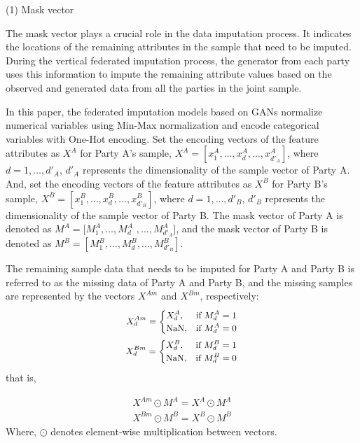 \documentclass[final,1p,times]{elsarticle}
\begin{document}
(1) Mask vector 

The mask vector plays a crucial role in the data imputation process. It indicates the locations of the remaining attributes in the sample that need to be imputed. During the vertical federated imputation process, the generator from each party uses this information to impute the remaining attribute values based on the observed and generated data from all the parties in the joint sample. 

In this paper, the federated imputation models based on GANs normalize numerical variables using Min-Max normalization and encode categorical variables with One-Hot encoding. Set the encoding vectors of the feature attributes as \( X^A \) for Party A's sample, \(X^A = [x_1^A, \dots, x_d^A, \dots, x_{d'_A}^A]\), where \( d = 1, \dots, d'_A \),  \( d'_A \) represents the dimensionality of the sample vector of Party A. And, set the encoding vectors of the feature attributes as \( X^B \) for Party B's sample, \(X^B = [x_1^B, \dots, x_d^B, \dots, x_{d'_B}^B]\), where \( d = 1, \dots, d'_B \), \( d'_B \) represents the dimensionality of the sample vector of Party B. The mask vector of Party A is denoted as \(M^A = [M_1^A, \dots, M_d^A\) \(,\dots,M_{d'_A}^A]\), and the mask vector of Party B is denoted as \(M^B = [M_1^B, \dots, M_d^B, \dots, M_{d'_B}^B]\). 

The remaining sample data that needs to be imputed for Party A and Party B is referred to as the missing data of Party A and Party B, and the missing samples are represented by the vectors \( X^{Am} \) and \( X^{Bm} \), respectively:
\begin{equation}
	\small
	\begin{split}
		X_{d}^{Am} = 
		\begin{cases} 
			X_d^A,   & \text{if } {M}_d^A = 1 \\ 
			\text{NaN}, & \text{if } {M}_d^A = 0 
		\end{cases}\\
		X_{d}^{Bm} = 
		\begin{cases} 
			X_d^B,   & \text{if } {M}_d^B = 1 \\ 
			\text{NaN}, & \text{if } {M}_d^B = 0 
		\end{cases}
	\end{split}
\end{equation}
that is,

\begin{equation}
	\begin{split}
		X^{Am}\odot{M}^A=X^A\odot{M}^A \\
		X^{Bm}\odot{M}^B=X^B\odot{M}^B
	\end{split}
\end{equation}
Where, $\odot$ denotes element-wise multiplication between vectors.
\end{document}
